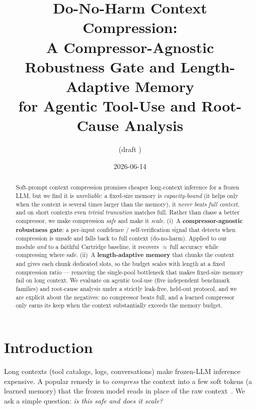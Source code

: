 \documentclass[11pt]{article}
\title{\textbf{Do-No-Harm Context Compression:}\\
A Compressor-Agnostic Robustness Gate and Length-Adaptive Memory\\
for Agentic Tool-Use and Root-Cause Analysis}
\author{(draft \version)}
\date{2026-06-14}
\begin{document}
\maketitle

\begin{abstract}
Soft-prompt context compression promises cheaper long-context inference for a frozen LLM, but we find it is
\emph{unreliable}: a fixed-size memory is \emph{capacity-bound} (it helps only when the context is several
times larger than the memory), it \emph{never beats full context}, and on short contexts even \emph{trivial
truncation} matches full. Rather than chase a better compressor, we make compression \emph{safe} and make it
\emph{scale}. (i)~A \textbf{compressor-agnostic robustness gate}: a per-input confidence / self-verification
signal that detects when compression is unsafe and falls back to full context (do-no-harm). Applied to our
module \emph{and} to a faithful Cartridge baseline, it recovers $\approx$\,full accuracy while compressing
where safe. (ii)~A \textbf{length-adaptive memory} that chunks the context and gives each chunk dedicated
slots, so the budget scales with length at a fixed compression ratio --- removing the single-pool bottleneck
that makes fixed-size memory fail on long context. We evaluate on agentic tool-use (five independent
benchmark families) and root-cause analysis under a strictly leak-free, held-out protocol, and we are explicit
about the negatives: no compressor beats full, and a learned compressor only earns its keep when the context
substantially exceeds the memory budget.
\end{abstract}

\section{Introduction}
Long contexts (tool catalogs, logs, conversations) make frozen-LLM inference expensive. A popular remedy is to
\emph{compress} the context into a few soft tokens (a learned memory) that the frozen model reads in place of
the raw context~\cite{cartridges,gist,icae}. We ask a simple question: \emph{is this safe and does it scale?}
\end{document}
